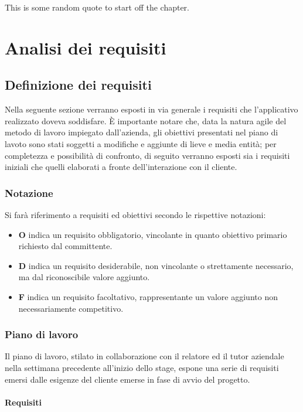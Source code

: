 

\begin{savequote}[75mm]
This is some random quote to start off the chapter.
\end{savequote}
\chapter{Analisi dei requisiti}
\label{sec:chap3}
\section{Definizione dei requisiti}
Nella seguente sezione verranno esposti in via generale i requisiti che l'applicativo realizzato doveva soddisfare. È importante notare che, data la natura agile del metodo di lavoro impiegato dall'azienda, gli obiettivi presentati nel piano di lavoto sono stati soggetti a modifiche e aggiunte di lieve e media entità; per completezza e possibilità di confronto, di seguito verranno esposti sia i requisiti iniziali che quelli elaborati a fronte dell'interazione con il cliente.
\subsection{Notazione}
Si farà riferimento a requisiti ed obiettivi secondo le rispettive notazioni:
\begin{itemize}
    \item \textbf{O} indica un requisito obbligatorio, vincolante in quanto obiettivo primario richiesto dal committente.
    \item \textbf{D} indica un requisito desiderabile, non vincolante o strettamente necessario, ma dal riconoscibile valore aggiunto.
    \item \textbf{F} indica un requisito facoltativo, rappresentante un valore aggiunto non necessariamente competitivo.
\end{itemize}
\subsection{Piano di lavoro}
Il piano di lavoro, stilato in collaborazione con il relatore ed il tutor aziendale nella settimana precedente all'inizio dello stage, espone una serie di requisiti emersi dalle esigenze del cliente emerse in fase di avvio del progetto.
\subsubsection{Requisiti}
